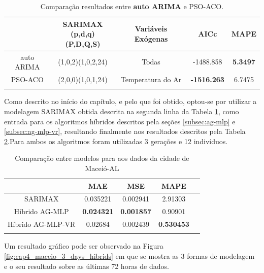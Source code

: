 \begin{table}[htbp]
\caption{Comparação resultados entre \textbf{auto ARIMA} e PSO-ACO.}
\begin{center}
\begin{tabular}{ccccc}
                    & \Longstack{SARIMAX \\ (p,d,q)(P,D,Q,S)} & Variáveis Exógenas & AICc & MAPE  \\\hline
auto ARIMA & (1,0,2)(1,0,2,24) & Todas & -1488.858 & \textbf{5.3497} \\\hline
PSO-ACO             & (2,0,0)(1,0,1,24) & Temperatura do Ar & \textbf{-1516.263} & 6.7475 \\\hline
\label{tab:cap4_comp_maceio_autoarima_psoaco}
\end{tabular}
\end{center}
\end{table}

Como descrito no início do capítulo, e pelo que foi obtido, optou-se por utilizar a modelagem SARIMAX obtida descrita na segunda linha da Tabela \ref{tab:cap4_comp_maceio_autoarima_psoaco}, como entrada para os algoritmos híbridos descritos pela seções \ref{subsec:ag-mlp} e \ref{subsec:ag-mlp-vr}, resultando finalmente nos resultados descritos pela Tabela \ref{tab:cap4_comp_maceio_agmlp_agmlpvr}.Para ambos os algoritmos foram utilizadas 3 gerações e 12 indivíduos.

\begin{table}[htbp]
\caption{Comparação entre modelos para aos dados da cidade de Maceió-AL}
\begin{center}
\begin{tabular}{ccccc}
                & MAE & MSE & MAPE \\\hline
SARIMAX         & 0.035221 & 0.002941 & 2.91303 \\\hline
Híbrido AG-MLP  & \textbf{0.024321} & \textbf{0.001857} & 0.90901 \\\hline
Híbrido AG-MLP-VR & 0.02684 & 0.002439 & \textbf{0.530453} \\\hline
\label{tab:cap4_comp_maceio_agmlp_agmlpvr}
\end{tabular}
\end{center}
\end{table}

Um resultado gráfico pode ser observado na Figura \ref{fig:cap4_maceio_3_days_hibrids} em que se mostra as 3 formas de modelagem e o seu resultado sobre as últimas 72 horas de dados.

